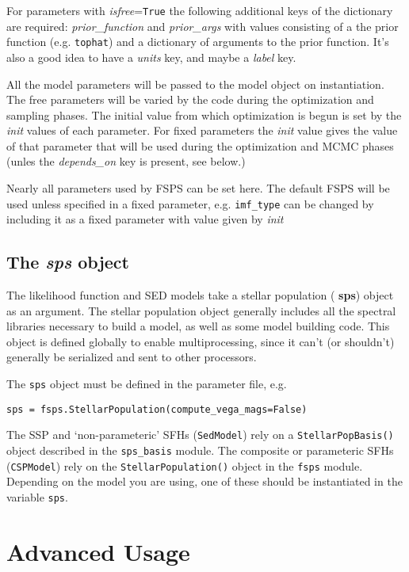 For parameters with {\it isfree}=\texttt{True} the following
additional keys of the dictionary are required: {\it prior_function}
and {\it prior_args} with values consisting of a the prior function
(e.g. \texttt{tophat}) and a dictionary of arguments to the prior
function. It's also a good idea to have a {\it units} key, and maybe a
{\it label} key.

All the model parameters will be passed to the model object on
instantiation.  The free parameters will be varied by the code during
the optimization and sampling phases.  The initial value from which
optimization is begun is set by the {\it init} values of each
parameter.  For fixed parameters the {\it init} value gives the value
of that parameter that will be used during the optimization and MCMC
phases (unles the {\it depends_on} key is present, see below.)

Nearly all parameters used by FSPS can be set here.  The default FSPS
will be used unless specified in a fixed parameter,
e.g. \texttt{imf_type} can be changed by including it as a fixed
parameter with value given by {\it init}

\subsection{The \emph{sps} object}
The likelihood function and SED models take a stellar population ({\bf
sps}) object as an argument.  The stellar population object generally
includes all the spectral libraries necessary to build a model, as
well as some model building code. This object is defined globally to
enable multiprocessing, since it can't (or shouldn't) generally be
serialized and sent to other processors.

The \texttt{sps} object must be defined in the parameter file, e.g. 

\begin{center}
\texttt{sps = fsps.StellarPopulation(compute_vega_mags=False)}
\end{center}

The SSP and `non-parameteric' SFHs (\texttt{SedModel}) rely on a
\texttt{StellarPopBasis()} object described in the \texttt{sps_basis}
module.  The composite or parameteric SFHs (\texttt{CSPModel}) rely on
the \texttt{StellarPopulation()} object in the \texttt{fsps} module.
Depending on the model you are using, one of these should be
instantiated in the variable \texttt{sps}.

\section{Advanced Usage}

